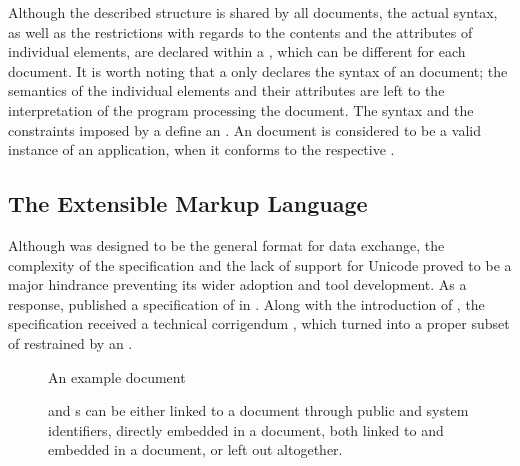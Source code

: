 \documentclass[a5paper,10pt]{book}
\begin{document}
Although the described structure is shared by all  documents, the
actual syntax, as well as the restrictions with regards to the contents and the
attributes of individual elements, are declared within a , which
can be different for each document. It is worth noting that a  only
declares the syntax of an  document; the semantics of the
individual elements and their attributes are left to the interpretation of the
program processing the document. The syntax and the constraints imposed by a
 define an 
. An  document is considered to be a
valid instance of an  application, when it conforms to the
respective .

\subsection{The Extensible Markup Language}
Although  was designed to be the general format for data exchange,
the complexity of the specification and the lack of support for Unicode proved
to be a major hindrance preventing its wider adoption and tool development. As a
response,  published a specification of  in
\citeyear{bray98}. Along with the introduction of , the
 specification received a technical corrigendum
\cite{goldfarb97:webSGML}, which turned  into a proper subset of
 restrained by an  .

\begin{figure}
  \caption{An example  document}
  \label{fig:recipe}\bigskip
  \caption{ and  s can be either linked
    to a document through public and system identifiers, directly embedded in
    a document, both linked to and embedded in a document, or left out
    altogether.}
  \label{fig:recipe-dtd}
\end{figure}
        
\end{document}
